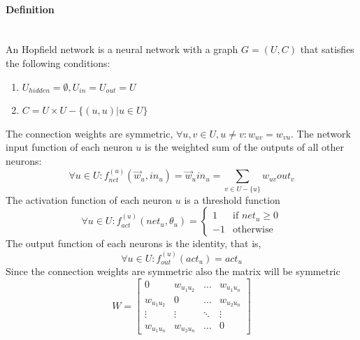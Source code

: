 \documentclass{article}
\begin{document}
\paragraph{Definition}\mbox{}\\
An Hopfield network is a neural network with a graph $G=(U,C)$ that satisfies the following conditions:
\begin{enumerate}
    \item $U_{hidden}=\emptyset, U_{in}=U_{out}=U$
    \item $C=U\times U-\{(u,u)|u\in U\}$
\end{enumerate}
The connection weights are symmetric, $\forall u,v\in U, u\neq v: w_{uv}=w_{vu}$. The network input
function of each neuron $u$ is the weighted sum of the outputs of all other neurons:
$$\forall u\in U: f_{net}^{(u)}(\vec{w}_u,in_u)=\vec{w}_u in_u=\sum_{v\in U-\{u\}}w_{uv}out_v$$
The activation function of each neuron $u$ is a threshold function
\[
\forall u\in U: f_{act}^{(u)}(net_u,\theta_u)=
\begin{cases}
    1&\text{if }net_u\geq 0\\
    -1&\text{otherwise}
\end{cases}
\]
The output function of each neurons is the identity, that is,
$$\forall u\in U: f_{out}^{(u)}(act_u)=act_u$$
Since the connection weights are symmetric also the matrix will be symmetric
\[
    W=
    \begin{bmatrix}
        0                & w_{u_1u_2}  & \dots  & w_{u_1u_n} \\
        w_{u_1u_2}       & 0           & \dots  & w_{u_2u_n} \\
        \vdots           &\vdots       & \ddots & \vdots \\
        w_{u_1u_n}       & w_{u_2u_n}  & \dots  & 0
    \end{bmatrix}
\]
\end{document}
